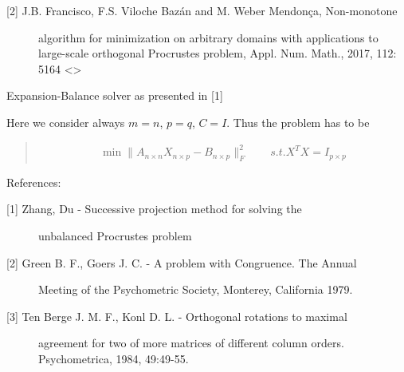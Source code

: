 \documentclass[a4paper,10pt,english]{sphinxmanual}
\begin{document}
\begin{fulllineitems}
\begin{description}
\item[{{[}2{]} J.B. Francisco, F.S. Viloche Bazán and M. Weber Mendonça, Non-monotone }] \leavevmode
algorithm for minimization on arbitrary domains with applications to 
large-scale orthogonal Procrustes problem, Appl. Num. Math., 2017, 
112: 51\textendash{}64 \textless{}\textgreater{}

\end{description}

\end{fulllineitems}


\begin{fulllineitems}
\label{\detokenize{skprocrustes:skprocrustes.eb_solver}}
Expansion-Balance solver as presented in {[}1{]}

Here we consider always \(m=n\), \(p=q\), \(C=I\).
Thus the problem has to be
\begin{quote}
\begin{equation*}
\begin{split}\min \lVert A_{n\times n}X_{n\times p}-B_{n\times p}\rVert_F^2 
\qquad s.t. X^TX=I_{p\times p}    \end{split}
\end{equation*}\end{quote}

References:
\begin{description}
\item[{{[}1{]} Zhang, Du - Successive projection method for solving the}] \leavevmode
unbalanced Procrustes problem

\item[{{[}2{]} Green B. F., Goers J. C. - A problem with Congruence. The Annual}] \leavevmode
Meeting of the Psychometric Society, Monterey,
California 1979.

\item[{{[}3{]} Ten Berge J. M. F., Konl D. L. - Orthogonal rotations to maximal}] \leavevmode
agreement for two of more matrices of different column
orders. Psychometrica, 1984, 49:49-55.

\end{description}

\end{fulllineitems}

\end{document}
